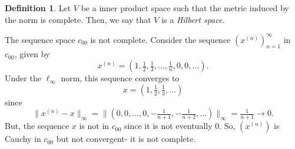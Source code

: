 \documentclass[a4paper, openany]{memoir}
\theoremstyle{definition}
\newtheorem{definition}{Definition}[section]
\theoremstyle{plain}
\begin{document}
\begin{definition}
    Let $V$ be a inner product space such that the metric induced by the norm is complete. Then, we say that $V$ is a \emph{Hilbert space}.
\end{definition}

The sequence space $c_{00}$ is not complete. Consider the sequence $(x^{(n)})_{n=1}^\infty$ in $c_{00}$, given by
\[x^{(n)} = (1, \tfrac{1}{2}, \tfrac{1}{3}, \dots, \tfrac{1}{n}, 0, 0, \dots).\]
Under the $\ell_\infty$ norm, this sequence converges to
\[x = (1, \tfrac{1}{2}, \tfrac{1}{3}, \dots)\]
since
\[\lVert x^{(n)} - x \rVert_\infty = \lVert (0, 0, \dots, 0, -\tfrac{1}{n+1}, -\tfrac{1}{n+2}, \dots) \rVert_\infty = \tfrac{1}{n+1} \to 0.\]
But, the sequence $x$ is not in $c_{00}$ since it is not eventually $0$. So, $(x^{(n)})$ is Cauchy in $c_{00}$ but not convergent- it is not complete.
\end{document}
